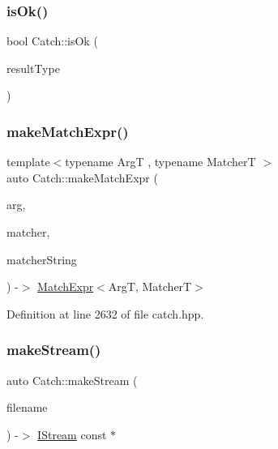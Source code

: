 \mbox{\label{namespace_catch_a5205869c81c06d3460759cb86676ae68}} 
\subsubsection{\texorpdfstring{is\+Ok()}{isOk()}}
{\footnotesize\ttfamily bool Catch\+::is\+Ok (\begin{DoxyParamCaption}\item[{\mbox{\hyperlink{struct_catch_1_1_result_was_a624e1ee3661fcf6094ceef1f654601ef}{Result\+Was\+::\+Of\+Type}}}]{result\+Type }\end{DoxyParamCaption})}

\mbox{\label{namespace_catch_a08c0e847b66dc31e1174aa9a74a441c9}} 
\subsubsection{\texorpdfstring{make\+Match\+Expr()}{makeMatchExpr()}}
{\footnotesize\ttfamily template$<$typename ArgT , typename MatcherT $>$ \\
auto Catch\+::make\+Match\+Expr (\begin{DoxyParamCaption}\item[{ArgT const \&}]{arg,  }\item[{MatcherT const \&}]{matcher,  }\item[{\mbox{\hyperlink{class_catch_1_1_string_ref}{String\+Ref}}}]{matcher\+String }\end{DoxyParamCaption}) -\/$>$ \mbox{\hyperlink{class_catch_1_1_match_expr}{Match\+Expr}}$<$ArgT, MatcherT$>$ }



Definition at line 2632 of file catch.\+hpp.

\mbox{\label{namespace_catch_af6d27462573d60c30c51acf1c980e3ff}} 
\subsubsection{\texorpdfstring{make\+Stream()}{makeStream()}}
{\footnotesize\ttfamily auto Catch\+::make\+Stream (\begin{DoxyParamCaption}\item[{\mbox{\hyperlink{class_catch_1_1_string_ref}{String\+Ref}} const \&}]{filename }\end{DoxyParamCaption}) -\/$>$  \mbox{\hyperlink{struct_catch_1_1_i_stream}{I\+Stream}} const $\ast$}

